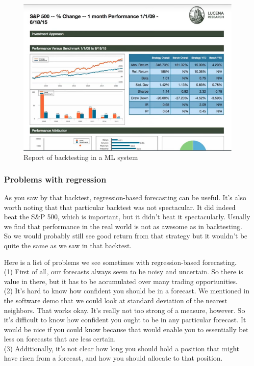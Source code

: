 \documentclass[12pt]{article}
\begin{document}
\begin{figure}[!ht]
\centering
\includegraphics[scale=0.5]{fig/fig79}
\caption{Report of backtesting in a ML system}
\end{figure}

\subsubsection{Problems with regression}

As you saw by that backtest, regression-based forecasting can be useful. It's also worth noting that that particular backtest was not spectacular. It did indeed beat the S\&P 500, which is important, but it didn't beat it spectacularly. Usually we find that performance in the real world is not as awesome as in backtesting. So we would probably still see good return from that strategy but it wouldn't be quite the same as we saw in that backtest. 

Here is a list of problems we see sometimes with regression-based forecasting. \\
(1) First of all, our forecasts always seem to be noisy and uncertain. So there is value in there, but it has to be accumulated over many trading opportunities. \\
(2) It's hard to know how confident you should be in a forecast. We mentioned in the software demo that we could look at standard deviation of the nearest neighbors. That works okay. It's really not too strong of a measure, however. So it's difficult to know how confident you ought to be in any particular forecast. It would be nice if you could know because that would enable you to essentially bet less on forecasts that are less certain. \\
(3) Additionally, it's not clear how long you should hold a position that might have risen from a forecast, and how you should allocate to that position. 
\end{document}
